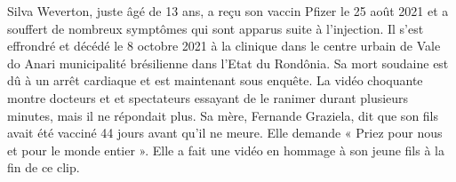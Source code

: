 Silva Weverton, juste âgé de 13 ans, a reçu son vaccin Pfizer le 25 août 2021 et
a souffert de nombreux symptômes qui sont apparus suite à l’injection. Il s’est
effrondré et décédé le 8 octobre 2021 à la clinique dans le centre urbain de
Vale do Anari municipalité brésilienne dans l’Etat du Rondônia. Sa mort soudaine
est dû à un arrêt cardiaque et est maintenant sous enquête. La vidéo choquante
montre docteurs et et spectateurs essayant de le ranimer durant plusieurs
minutes, mais il ne répondait plus. Sa mère, Fernande Graziela, dit que son fils
avait été vacciné 44 jours avant qu’il ne meure. Elle demande « Priez pour nous
et pour le monde entier ». Elle a fait une vidéo en hommage à son jeune fils à
la fin de ce clip.

